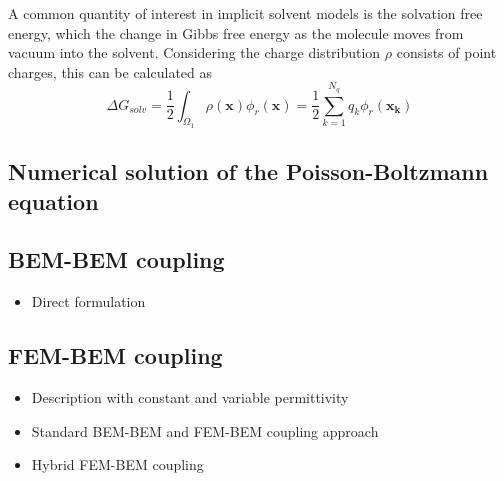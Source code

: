 A common quantity of interest in implicit solvent models is the solvation free energy, which the change in Gibbs free energy as the molecule moves from vacuum into the solvent. Considering the charge distribution $\rho$ consists of point charges, this can be calculated as
%
\begin{equation}\label{eq:dG}
\Delta G_{solv} = \frac{1}{2}\int_{\Omega_1} \rho(\mathbf{x})\phi_{r}(\mathbf{x}) = \frac{1}{2}\sum_{k=1}^{N_q} q_k\phi_r(\mathbf{x_k})
\end{equation}

\subsection*{\sffamily \large Numerical solution of the Poisson-Boltzmann equation}

\subsection*{\sffamily \large BEM-BEM coupling}
\begin{itemize}
    \item Direct formulation
\end{itemize}

\subsection*{\sffamily \large FEM-BEM coupling}

\begin{itemize}
    \item Description with constant and variable permittivity 
    \item Standard BEM-BEM and FEM-BEM coupling approach
    \item Hybrid FEM-BEM coupling
\end{itemize}
